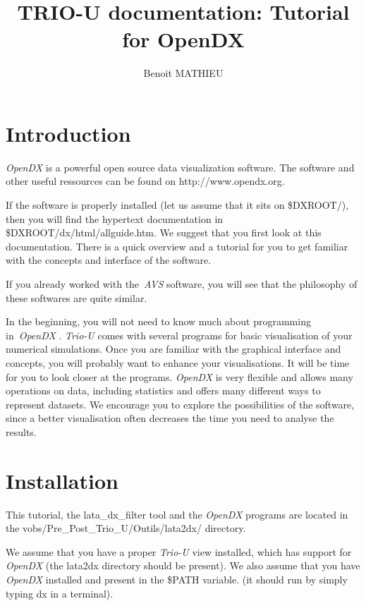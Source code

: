\documentclass[a4paper,10pt,dvips]{article}
\begin{document}
\newcommand{\opendx}[0]{\textit{OpenDX} }
\newcommand{\triou}[0]{\textit{Trio-U} }

\title{TRIO-U documentation: Tutorial for OpenDX}
\author{Benoit MATHIEU}
\maketitle

\section{Introduction}

\opendx is a powerful open source data visualization software.
The software and other useful ressources can be found on
\hbox{http://www.opendx.org}.

If the software is properly installed (let us assume that
it sits on \textsf{\$DXROOT/}), then you will find
the hypertext documentation in \textsf{\$DXROOT/dx/html/allguide.htm}.
We suggest that you first look at this documentation. There
is a quick overview and a tutorial for you to get familiar with
the concepts and interface of the software.

If you already worked with the~\textit{AVS} software, you will
see that the philosophy of these softwares are quite similar.

In the beginning, you will not need to know much about programming
in~\opendx. \triou comes with several programs for
basic visualisation of your numerical simulations. Once you are
familiar with the graphical interface and concepts, you will
probably want to enhance your visualisations. It will be time
for you to look closer at the programs. \opendx is very flexible
and allows many operations on data, including statistics and
offers many different ways to represent datasets. We encourage
you to explore the possibilities of the software, since a better
visualisation often decreases the time you need to analyse the
results.

\section{Installation}

This tutorial, the \textsf{lata\_dx\_filter} tool and the \opendx
programs are located in the
\textsf{vobs/Pre\_Post\_Trio\_U/Outils/lata2dx/} directory.

We assume that you have a proper \triou view installed,
which has support for \opendx (the \textsf{lata2dx} directory
should be present). We also assume that you have \opendx installed
and present in the \textsf{\$PATH} variable.
(it should run by simply typing \textsf{dx} in a terminal).
\end{document}
